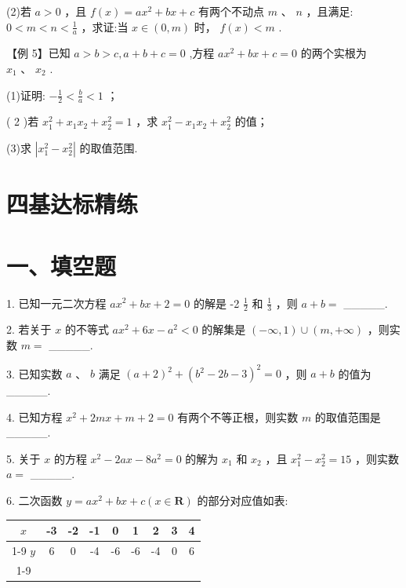 (2)若 $a > 0$ ，且 $f\left( x\right)  = a{x}^{2} + {bx} + c$ 有两个不动点 $m$ 、 $n$ ，且满足: $0 < m < n < \frac{1}{a}$ ，求证:当 $x \in  \left( {0,m}\right)$ 时， $f\left( x\right)  < m$ .

【例 5】已知 $a > b > c,a + b + c = 0$ ,方程 $a{x}^{2} + {bx} + c = 0$ 的两个实根为 ${x}_{1}\text{ 、 }{x}_{2}$ .

(1)证明: $- \frac{1}{2} < \frac{b}{a} < 1$ ；

( 2 )若 ${x}_{1}^{2} + {x}_{1}{x}_{2} + {x}_{2}^{2} = 1$ ，求 ${x}_{1}^{2} - {x}_{1}{x}_{2} + {x}_{2}^{2}$ 的值；

(3)求 $\left| {{x}_{1}^{2} - {x}_{2}^{2}}\right|$ 的取值范围.

\section*{四基达标精练}

\section*{一、填空题}

1. 已知一元二次方程 $a{x}^{2} + {bx} + 2 = 0$ 的解是 -2 $\frac{1}{2}$ 和 $\frac{1}{3}$ ，则 $a + b =$ \_\_\_\_\_.

2. 若关于 $x$ 的不等式 $a{x}^{2} + {6x} - {a}^{2} < 0$ 的解集是 $\left( {-\infty ,1}\right)  \cup  \left( {m, + \infty }\right)$ ，则实数 $m =$ \_\_\_\_\_.

3. 已知实数 $a$ 、 $b$ 满足 ${\left( a + 2\right) }^{2} + {\left( {b}^{2} - 2b - 3\right) }^{2} = 0$ ，则 $a + b$ 的值为\_\_\_\_\_.

4. 已知方程 ${x}^{2} + {2mx} + m + 2 = 0$ 有两个不等正根，则实数 $m$ 的取值范围是\_\_\_\_\_.

5. 关于 $x$ 的方程 ${x}^{2} - {2ax} - 8{a}^{2} = 0$ 的解为 ${x}_{1}$ 和 ${x}_{2}$ ，且 ${x}_{1}^{2} - {x}_{2}^{2} = {15}$ ，则实数 $a =$ \_\_\_\_\_.

6. 二次函数 $y = a{x}^{2} + {bx} + c\left( {x \in  \mathbf{R}}\right)$ 的部分对应值如表:

\begin{center}
\begin{tabular}{|c|c|c|c|c|c|c|c|c|}
\hline
$x$ & -3 & -2 & -1 & 0 & 1 & 2 & 3 & 4 \\
\cline{1-9}
$y$ & 6 & 0 & -4 & -6 & -6 & -4 & 0 & 6 \\
\cline{1-9}
\hline
\end{tabular}
\end{center}

